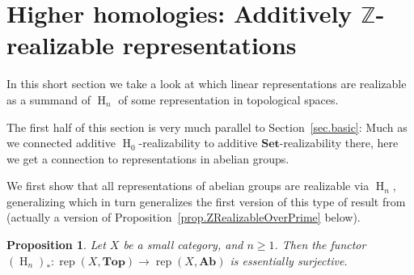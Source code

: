 \documentclass[a4paper]{amsart}
\theoremstyle{plain}
\newtheorem{proposition}[theorem]{Proposition}
\theoremstyle{definition}
\theoremstyle{remark}
\newcommand{\Top}{\mathbf{Top}}
\newcommand{\Set}{\mathbf{Set}}
\newcommand{\Z}{\mathbb{Z}}
\DeclareMathOperator{\rep}{rep}
\begin{document}
\section{Higher homologies: Additively \( \Z \)-realizable representations}
\label{sec.higherhom}

In this short section we take a look at which linear representations are realizable as a summand of \( \operatorname{H}_n \) of some representation in topological spaces.

The first half of this section is very much parallel to Section~\ref{sec.basic}: Much as we connected additive \( \operatorname{H}_0 \)-realizability to additive \( \Set \)-realizability there, here we get a connection to representations in abelian groups.

We first show that all representations of abelian groups are realizable via \( \operatorname{H}_n \), generalizing \cite{harrington2019stratifying} which in turn generalizes the first version of this type of result from \cite{carlsson2007theory} (actually a version of Proposition~\ref{prop.ZRealizableOverPrime} below).

\begin{proposition}
Let \( X \) be a small category, and \( n \geq 1 \). Then the functor \( (\operatorname{H}_n)_* \colon \rep(X, \Top) \to \rep(X, \mathbf{Ab}) \) is essentially surjective.
\end{proposition}
\end{document}
